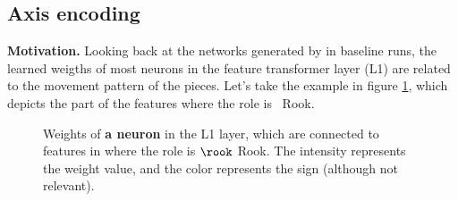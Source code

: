 \subsection{Axis encoding}
\label{sec:axis_encoding}

\textbf{Motivation.} Looking back at the networks generated by  in baseline runs, the learned weigths of most neurons in the feature transformer layer (L1) are related to the movement pattern of the pieces. Let's take the example in figure \ref{fig:rook_weights}, which depicts the  part of the features where the role is \symrook\ Rook.

\begin{figure}[h]
\centering
{}%
\qquad
{}%
\caption{Weights of \textbf{a neuron} in the L1 layer, which are connected to features in  where the role is $\rook$ Rook. The intensity represents the weight value, and the color represents the sign (although not relevant).}
\label{fig:rook_weights}
\end{figure}

